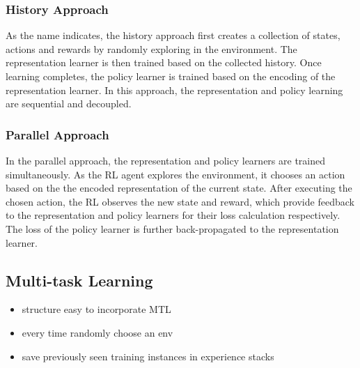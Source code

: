 \subsubsection{History Approach}
As the name indicates, the history approach first creates a collection of states, actions and rewards by randomly exploring in the environment.
The representation learner is then trained based on the collected history.
Once learning completes, the policy learner is trained based on the encoding of the representation learner.
In this approach, the representation and policy learning are sequential and decoupled. 

\subsubsection{Parallel Approach}
In the parallel approach, the representation and policy learners are trained simultaneously.
As the RL agent explores the environment, it chooses an action based on the the encoded representation of the current state.
After executing the chosen action, the RL observes the new state and reward, which provide feedback to the representation and policy learners for their loss calculation respectively.
The loss of the policy learner is further back-propagated to the representation learner.

\subsection{Multi-task Learning}
\begin{itemize}
	\item structure easy to incorporate MTL
	\item every time randomly choose an env
	\item save previously seen training instances in experience stacks
\end{itemize}